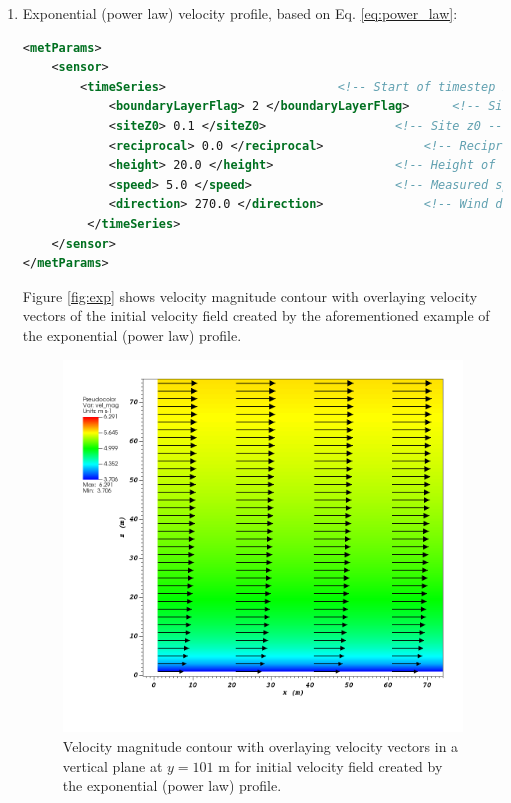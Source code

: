 \begin{enumerate}
\item Exponential (power law) velocity profile, based on Eq. \ref{eq:power_law}:

\begin{lstlisting}[language=XML]
<metParams>
	<sensor>
	    <timeSeries>						<!-- Start of timestep informastion for a sensor -->
       		<boundaryLayerFlag> 2 </boundaryLayerFlag> 		<!-- Site boundary layer flag (1-log (default), 2-exp, 3-urban canopy, 4-data entry) -->
       		<siteZ0> 0.1 </siteZ0> 					<!-- Site z0 -->
       		<reciprocal> 0.0 </reciprocal> 				<!-- Reciprocal Monin-Obukhov Length (1/m) -->
       		<height> 20.0 </height> 				<!-- Height of the sensor -->
       		<speed> 5.0 </speed> 					<!-- Measured speed at the sensor height -->
       		<direction> 270.0 </direction> 				<!-- Wind direction of sensor -->
    	 </timeSeries>
	</sensor>
</metParams>
\end{lstlisting}

Figure \ref{fig:exp} shows velocity magnitude contour with overlaying  velocity vectors of the initial velocity field created by the aforementioned example of the exponential (power law) profile.

\begin{figure}[H]
\includegraphics[width=\textwidth,keepaspectratio]{Images/exp_y_101.png}
\caption{Velocity magnitude contour with overlaying velocity vectors in a vertical plane at $y=101$ m for initial velocity field created by the exponential (power law) profile.}
\end{figure}
\noindent



\end{enumerate}
